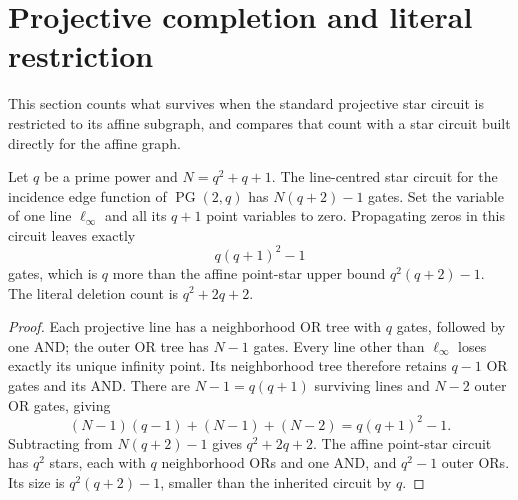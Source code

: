 \section{Projective completion and literal restriction}
This section counts what survives when the standard projective star
circuit is restricted to its affine subgraph, and compares that count
with a star circuit built directly for the affine graph.
\begin{proposition}
Let $q$ be a prime power and $N=q^2+q+1$.  The line-centred star
circuit for the incidence edge function of $\operatorname{PG}(2,q)$
has $N(q+2)-1$ gates.  Set the variable of one line $\ell_\infty$
and all its $q+1$ point variables to zero.  Propagating zeros in this
circuit leaves exactly
\[
 q(q+1)^2-1
\]
gates, which is $q$ more than the affine point-star upper bound
$q^2(q+2)-1$.  The literal deletion count is $q^2+2q+2$.
\end{proposition}
\begin{proof}
Each projective line has a neighborhood OR tree with $q$ gates,
followed by one AND; the outer OR tree has $N-1$ gates.  Every line
other than $\ell_\infty$ loses exactly its unique infinity point.
Its neighborhood tree therefore retains $q-1$ OR gates and its AND.
There are $N-1=q(q+1)$ surviving lines and $N-2$ outer OR gates, giving
\[
 (N-1)(q-1)+(N-1)+(N-2)=q(q+1)^2-1.
\]
Subtracting from $N(q+2)-1$ gives $q^2+2q+2$.
The affine point-star circuit has $q^2$ stars, each with $q$ neighborhood
ORs and one AND, and $q^2-1$ outer ORs.  Its size is $q^2(q+2)-1$,
smaller than the inherited circuit by $q$.
\end{proof}

